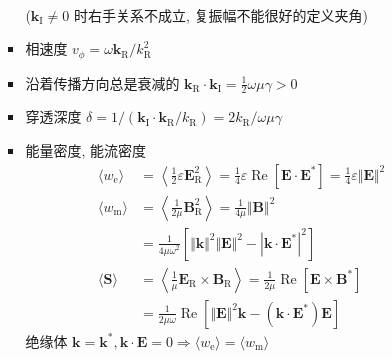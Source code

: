 \documentclass[12pt,a4paper]{article}%
\numberwithin{equation}{section}%
\renewcommand*{\vec}[1]{\bm{#1}}%
\renewcommand*{\Re}{\operatorname{Re}}
\begin{document}
\begin{enumerate}
\begin{itemize}
\begin{itemize}
\begin{align}
            \end{align}
            ($\vec k_{\mathrm I} \neq 0$ 时右手关系不成立, 复振幅不能很好的定义夹角)
            \item 相速度 $v_\phi = \omega\vec k_{\mathrm R}/k_{\mathrm R}^2$
            \item 沿着传播方向总是衰减的 $\vec k_{\mathrm R}\cdot\vec k_{\mathrm I} = \frac 12 \omega\mu\gamma > 0$
            \item 穿透深度 $\delta = 1/(\vec k_{\mathrm I}\cdot\vec k_{\mathrm R}/k_{\mathrm R}) = 2k_{\mathrm R}/\omega\mu\gamma$
            \item 能量密度, 能流密度
            \begin{align}
                \langle w_{\mathrm e} \rangle &= \left\langle \frac 12\varepsilon \vec E_{\mathrm R}^2\right\rangle = \frac 14\varepsilon\Re[\vec E\cdot\vec E^*] = \frac 14\varepsilon\Vert\vec E\Vert^2\\
                \langle w_{\mathrm m} \rangle &= \left\langle \frac 1{2\mu}\vec B_{\mathrm R}^2\right\rangle = \frac 1{4\mu}\Vert\vec B\Vert^2 \\
                &= \frac 1{4\mu\omega^2}\left[\Vert\vec k\Vert^2\Vert\vec E\Vert^2 - |\vec k\cdot\vec E^*|^2\right]\\
                \langle\vec S \rangle &= \left \langle\frac 1\mu\vec E_{\mathrm R}\times\vec B_{\mathrm R}\right \rangle = \frac 1{2\mu}\Re[\vec E\times\vec B^*]\\
                &= \frac 1{2\mu\omega}\Re[\Vert\vec E\Vert^2\vec k-(\vec k\cdot\vec E^*)\vec E]
            \end{align}
            绝缘体 $\vec k = \vec k^*, \vec k\cdot\vec E = 0\Rightarrow \langle w_{\mathrm e} \rangle = \langle w_{\mathrm m} \rangle$
        \end{itemize}
    \end{itemize}
\end{enumerate}
\end{document}
